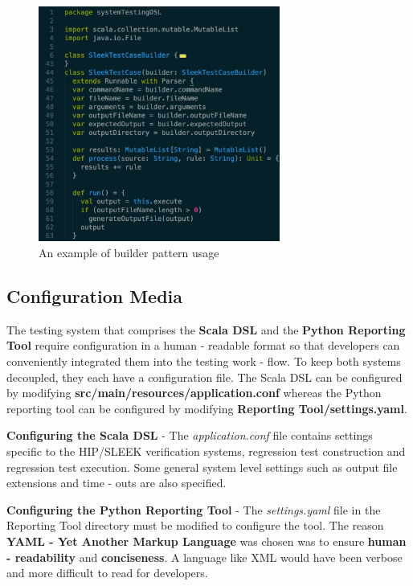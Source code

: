 \documentclass[12pt]{article}
\begin{document}
\begin{figure}[H]
  \centering
    \includegraphics[width=300px]{figures/builder_pattern.png}
  \caption{An example of builder pattern usage}
\end{figure}

\subsection{Configuration Media}

The testing system that comprises the \textbf{Scala DSL} and the \textbf{Python Reporting Tool} require configuration in a human - readable format so that developers can conveniently integrated them into the testing work - flow. To keep both systems decoupled, they each have a configuration file. The Scala DSL can be configured by modifying \textbf{src/main/resources/application.conf} whereas the Python reporting tool can be configured by modifying \textbf{Reporting Tool/settings.yaml}.
\bigskip

\noindent
\textbf{Configuring the Scala DSL} - The \textit{application.conf} file contains settings specific to the HIP/SLEEK verification systems, regression test construction and regression test execution. Some general system level settings such as output file extensions and time - outs are also specified.
\bigskip

\noindent
\textbf{Configuring the Python Reporting Tool} - The \textit{settings.yaml} file in the Reporting Tool directory must be modified to configure the tool. The reason \textbf{YAML - Yet Another Markup Language} was chosen was to ensure \textbf{human - readability} and \textbf{conciseness}. A language like XML would have been verbose and more difficult to read for developers.
\end{document}
